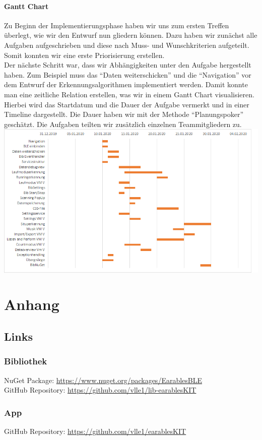 \documentclass[a4paper,12pt]{article}
\begin{document}
\paragraph{Gantt Chart}
Zu Beginn der Implementierungsphase haben wir uns zum ersten Treffen überlegt, wie wir den Entwurf nun gliedern können. Dazu haben wir zunächst alle Aufgaben aufgeschrieben und diese nach Muss- und Wunschkriterien aufgeteilt. Somit konnten wir eine erste Priorisierung erstellen.\\
 Der nächste Schritt war, dass wir Abhängigkeiten unter den Aufgabe hergestellt haben. Zum Beispiel muss das ``Daten weiterschicken'' und die ``Navigation'' vor dem Entwurf der Erkennungsalgorithmen implementiert werden. Damit konnte man eine zeitliche Relation erstellen, was wir in einem Gantt Chart visualisieren. Hierbei wird das Startdatum und die Dauer der Aufgabe vermerkt und in einer Timeline dargestellt.
Die Dauer haben wir mit der Methode ``Planungspoker'' geschätzt. Die Aufgaben teilten wir zusätzlich einzelnen Teammitgliedern zu.
\newline
\newline
\includegraphics[width=\textwidth, height=0.5\textheight]{bilder/Implementierungsplan.png}

\section{Anhang}
\subsection{Links}
\subsubsection{Bibliothek}
NuGet Package: \url{https://www.nuget.org/packages/EarablesBLE}\\
GitHub Repository: \url{https://github.com/vlle1/lib-earablesKIT}
\subsubsection{App}
GitHub Repository: \url{https://github.com/vlle1/earablesKIT}


\printglossaries
{}
\end{document}
